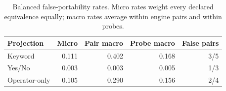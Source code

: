 \begin{table}[H]
\centering
\caption{Balanced false-portability rates. Micro rates weight every declared equivalence equally; macro rates average within engine pairs and within probes.}
\label{tab:balanced-false-portability}
\small
\begin{tabular}{lrrrr}
\toprule
Projection & Micro & Pair macro & Probe macro & False pairs \\
\midrule
Keyword & 0.111 & 0.402 & 0.168 & 3/5 \\
Yes/No & 0.003 & 0.003 & 0.005 & 1/3 \\
Operator-only & 0.105 & 0.290 & 0.156 & 2/4 \\
\bottomrule
\end{tabular}
\end{table}
